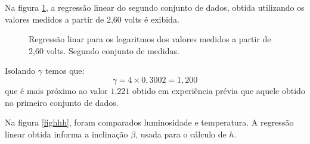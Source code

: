 \documentclass[brazilian,12pt,a4paper,final]{article}
\begin{document}
Na figura \ref{figfimpeq2}, a regressão linear do segundo conjunto de dados, 
obtida utilizando os valores medidos a partir de 2,60 volts é exibida.

\begin{figure}[htbp!]
  \caption{Regressão linar para os logaritmos dos valores medidos a partir de 2,60 volts. Segundo conjunto de medidas.}
  \label{figfimpeq2}
  \centering
\end{figure}

Isolando $\gamma$ temos que:
$$\gamma=4\times 0,3002=1,200$$
que é mais próximo ao valor $1.221$ obtido em experiência prévia que 
aquele obtido no primeiro conjunto de dados.

Na figura \ref{fighhh}, foram comparados luminosidade e temperatura. A regressão linear obtida informa a inclinação $\beta$, usada para o cálculo de $h$.
\end{document}

